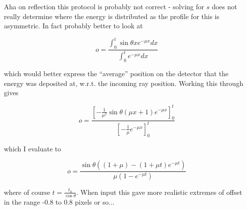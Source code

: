 \documentclass{article}
\begin{document}
Aha on reflection this protocol is probably not correct - solving for
$s$ does not really determine where the energy is distributed as the
profile for this is asymmetric. In fact probably better to look at

\begin{equation}
o = \frac{\int_0^t \sin \theta x e^{-\mu x} dx}{\int_0^t e^{-\mu x} dx}
\end{equation}

\noindent
which would better express the ``average'' position on the detector
that the energy was deposited at, w.r.t. the incoming ray
position. Working this through gives

\begin{equation}
o = \frac{\left[ - \frac{1}{\mu^2} \sin \theta \left( \mu x + 1
    \right)e^{-\mu x} \right]_0^t}
{\left[ - \frac{1}{\mu} e^{-\mu x} \right]_0^t}
\end{equation}

\noindent
which I evaluate to

\begin{equation}
o = \frac{\sin \theta \left( \left( 1 + \mu \right) - \left( 1 + \mu t
    \right) e^{-\mu t}\right)} {\mu \left( 1 - e^{-\mu t} \right)}
\end{equation}

\noindent
where of course $t = \frac{t_0}{\cos \theta}$. When input this gave
more realistic extremes of offset in the range 
-0.8 to 0.8 pixels or so... 
\end{document}

